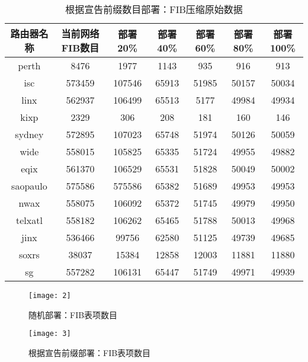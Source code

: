 \begin{table}[h]
    \centering
    \caption{根据宣告前缀数目部署：FIB压缩原始数据}
    \label{tab:prefixorigindata}
        \begin{tabular}{|c|c|c|c|c|c|c|}
            \hline
            路由器名称 & 当前网络FIB数目 & 部署20\% &部署40\% &部署60\% &部署80\% &部署100\% \\ \hline
            perth    & 8476   & 1977   & 1143   & 935   & 916   & 913     \\ \hline
            isc      & 573459 & 107546 & 65913  & 51985 & 50157 & 50034    \\ \hline
            linx     & 562937 & 106499 & 65513  & 5177  & 49984 & 49934     \\ \hline
            kixp     & 2329   & 306    & 208    & 181   & 160   & 146        \\ \hline
            sydney   & 572895 & 107023 & 65748  & 51974 & 50126 & 50059       \\ \hline
            wide     & 558015 & 105825 & 65335  & 51724 & 49955 & 49882        \\ \hline
            eqix     & 561370 & 106529 & 65531  & 51828 & 50049 & 50002         \\ \hline
            saopaulo & 575586 & 575586 & 65382  & 51689 & 49953 & 49953          \\ \hline
            nwax     & 558075 & 106092 & 65372  & 51745 & 49979 & 49950           \\ \hline
            telxatl  & 558182 & 106262 & 65465  & 51788 & 50013 & 49968            \\ \hline
            jinx     & 536466 & 99756  & 62580  & 51125 & 49739 & 49685             \\ \hline
            soxrs    & 38037  & 15384  & 12858  & 12003 & 11881 & 11880              \\ \hline
            sg       & 557282 & 106131 & 65447  & 51749 & 49971 & 49939               \\ \hline
        \end{tabular}
\end{table}

\begin{figure}
  \centering
  \texttt{[image: 2]}
  \caption{随机部署：FIB表项数目}
  \label{fig:2}
\end{figure}

\begin{figure}
  \centering
  \texttt{[image: 3]}
  \caption{根据宣告前缀部署：FIB表项数目}
  \label{fig:3}
\end{figure}


